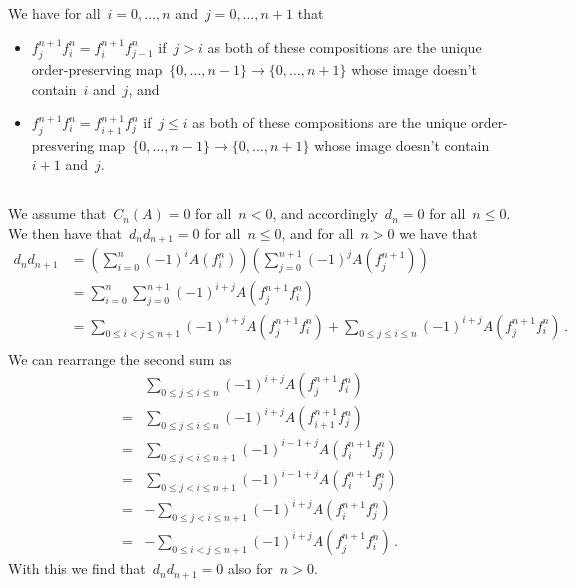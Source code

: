 \section{}

We have for all~$i = 0, \dotsc, n$ and~$j = 0, \dotsc, n+1$ that
\begin{itemize}
  \item
    $f^{n+1}_j f^n_i = f^{n+1}_i f^n_{j-1}$ if~$j > i$ as both of these compositions are the unique order-preserving map~$\{0, \dotsc, n-1\} \to \{0, \dotsc, n+1\}$ whose image doesn’t contain~$i$ and~$j$, and
  \item
    $f^{n+1}_j f^n_i = f^{n+1}_{i+1} f^n_j$ if~$j \leq i$ as both of these compositions are the unique order-presvering map~$\{0, \dotsc, n-1\} \to \{0, \dotsc, n+1\}$ whose image doesn’t contain~$i+1$ and~$j$.
\end{itemize}





\subsection{}

We assume that~$C_n(A) = 0$ for all~$n < 0$, and accordingly~$d_n = 0$ for all~$n \leq 0$.
We then have that~$d_n d_{n+1} = 0$ for all~$n \leq 0$, and for all~$n > 0$ we have that
\begin{align*}
      d_n d_{n+1}
  &=  \left( \sum_{i=0}^n (-1)^i A(f^n_i) \right)
      \left( \sum_{j=0}^{n+1} (-1)^j A(f^{n+1}_j) \right) \\
  &=  \sum_{i=0}^n \sum_{j=0}^{n+1} (-1)^{i+j} A(f^{n+1}_j f^n_i) \\
  &=    \sum_{0 \leq i < j \leq n+1} (-1)^{i+j} A(f^{n+1}_j f^n_i)
      + \sum_{0 \leq j \leq i \leq n} (-1)^{i+j} A(f^{n+1}_j f^n_i) \,. \\
\end{align*}
We can rearrange the second sum as
\begin{align*}
   {}&  \sum_{0 \leq j \leq i \leq n} (-1)^{i+j} A(f^{n+1}_j f^n_i) \\
  ={}&  \sum_{0 \leq j \leq i \leq n} (-1)^{i+j} A(f^{n+1}_{i+1} f^n_j) \\
  ={}&  \sum_{0 \leq j < i \leq n+1} (-1)^{i-1+j} A(f^{n+1}_i f^n_j) \\
  ={}&  \sum_{0 \leq j < i \leq n+1} (-1)^{i-1+j} A(f^{n+1}_i f^n_j) \\
  ={}&  -\sum_{0 \leq j < i \leq n+1} (-1)^{i+j} A(f^{n+1}_i f^n_j)  \\
  ={}&  -\sum_{0 \leq i < j \leq n+1} (-1)^{i+j} A(f^{n+1}_j f^n_i) \,.
\end{align*}
With this we find that~$d_n d_{n+1} = 0$ also for~$n > 0$.





